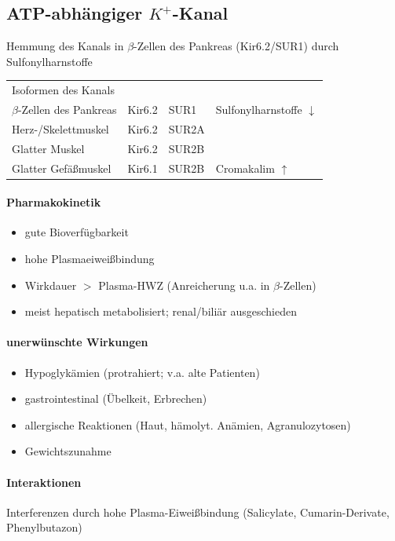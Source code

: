 \documentclass[10pt,a4paper]{report}
\begin{document}
\subsection{ATP-abhängiger $K^+$-Kanal} %
\label{ssub:atp_abh_ngiger_k_kanal}
Hemmung des Kanals in $\beta$-Zellen des Pankreas (Kir6.2/SUR1) durch Sulfonylharnstoffe \\
\begin{tabularx}{\textwidth}{XXXX}
Isoformen des Kanals&&&\\
$\beta$-Zellen des Pankreas&Kir6.2&SUR1&Sulfonylharnstoffe $\downarrow$\\
Herz-/Skelettmuskel&Kir6.2&SUR2A&\\
Glatter Muskel&Kir6.2&SUR2B\\
Glatter Gefäßmuskel&Kir6.1&SUR2B&Cromakalim $\uparrow$\\
\end{tabularx} 
\paragraph{Pharmakokinetik} %
\label{subp:pharmakokinetik}
\begin{itemize}
	\item gute Bioverfügbarkeit
	\item hohe Plasmaeiweißbindung
	\item Wirkdauer $>$ Plasma-HWZ (Anreicherung u.a. in $\beta$-Zellen)
	\item meist hepatisch metabolisiert; renal/biliär ausgeschieden
\end{itemize}
\paragraph{unerwünschte Wirkungen} %
\label{subp:unerw_nschte_wirkungen}
\begin{itemize}
	\item  Hypoglykämien (protrahiert; v.a. alte Patienten)
	\item gastrointestinal (Übelkeit, Erbrechen)
	\item allergische Reaktionen (Haut, hämolyt. Anämien, Agranulozytosen)
	\item Gewichtszunahme
\end{itemize}
\paragraph{Interaktionen} %
\label{subp:interaktionen}
Interferenzen durch hohe Plasma-Eiweißbindung (Salicylate, Cumarin-Derivate, Phenylbutazon)
\end{document}

